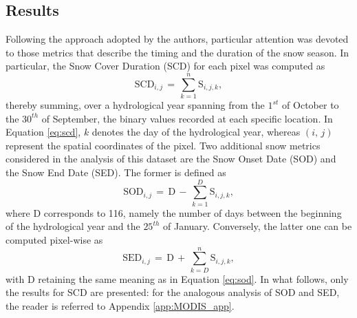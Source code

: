 \subsection{Results}

Following the approach adopted by the authors, particular attention was devoted to those metrics that describe the timing and the duration of the snow 
season. In particular, the Snow Cover Duration (SCD) for each pixel was computed as
\begin{equation}
    \text{SCD}_{i,j}\,=\,\sum_{k=1}^{n} \text{S}_{i,j,k},
    \label{eq:scd}
\end{equation}
thereby summing, over a hydrological year spanning from the $1^{st}$ of October to the $30^{th}$ of September, the binary values recorded at each 
specific location. In Equation \eqref{eq:scd}, $k$ denotes the day of the hydrological year, whereas $(i,\,j)$ represent the spatial coordinates of the 
pixel. Two additional snow metrics considered in the analysis of this dataset are the Snow Onset Date (SOD) and the Snow End Date (SED). The former is 
defined as 
\begin{equation}
    \text{SOD}_{i,j}\,=\,\text{D}\,-\,\sum_{k=1}^{D} \text{S}_{i,j,k},
    \label{eq:sod}
\end{equation}
where $\text{D}$ corresponds to 116, namely the number of  days between the beginning of the hydrological year and the $25^{th}$ of 
January. Conversely, the latter one can be computed pixel-wise as
\begin{equation}
    \text{SED}_{i,j}\,=\,\text{D}\,+\,\sum_{k=D}^{n} \text{S}_{i,j,k},
    \label{eq:sed}
\end{equation}
with D retaining the same meaning as in Equation \eqref{eq:sod}. In what follows, only the results for SCD are presented: for the analogous analysis of 
SOD and SED, the reader is referred to Appendix \ref{app:MODIS_app}.

